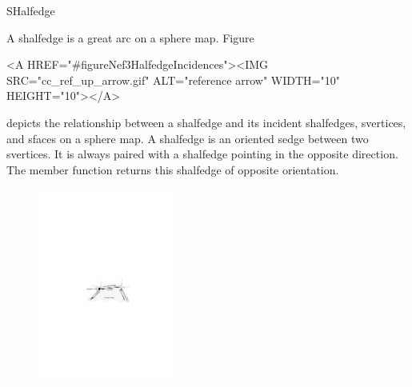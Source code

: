 
\ccRefPageBegin



\begin{ccRefClass}{SHalfedge}

\ccDefinition

A shalfedge is a great arc on a sphere map. 
Figure~\begin{ccHtmlOnly}
  <A HREF="#figureNef3HalfedgeIncidences"><IMG 
  SRC="cc_ref_up_arrow.gif" ALT="reference arrow" WIDTH="10" HEIGHT="10"></A>
\end{ccHtmlOnly}
depicts the relationship between a shalfedge and its incident
shalfedges, svertices, and sfaces on a sphere map.  A shalfedge is 
an oriented sedge between two svertices. It is always paired with a 
shalfedge pointing in
the opposite direction. The  member function returns
this shalfedge of opposite orientation.

\begin{ccTexOnly}
    \begin{figure}[bht]
        \begin{center}
          \parbox{0.4\textwidth}{%
              \includegraphics[width=0.4\textwidth]{Nef_3_ref/fig/shalfedge}%
          }
        \end{center}
        \label{figureNef3HalfedgeIncidences}
    \end{figure}
\end{ccTexOnly}


\end{ccRefClass}
